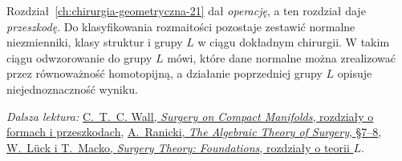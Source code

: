 Rozdział~\ref{ch:chirurgia-geometryczna-21}
dał \emph{operację}, a ten rozdział daje
\emph{przeszkodę}. Do klasyfikowania
rozmaitości pozostaje zestawić normalne
niezmienniki, klasy struktur i grupy $L$
w ciągu dokładnym chirurgii. W takim ciągu
odwzorowanie do grupy $L$ mówi, które dane normalne
można zrealizować przez równoważność
homotopijną, a działanie poprzedniej grupy
$L$ opisuje niejednoznaczność wyniku.

\par\smallskip
{\footnotesize\noindent\emph{Dalsza lektura:}
\href{https://webhomes.maths.ed.ac.uk/~v1ranick/books/scm.pdf}
{C.~T.~C. Wall, \emph{Surgery on Compact Manifolds},
rozdziały o formach i przeszkodach},
\href{https://webhomes.maths.ed.ac.uk/~v1ranick/papers/ats.pdf}
{A.\ Ranicki, \emph{The Algebraic Theory of Surgery},
§7--8},
\href{https://link.springer.com/book/10.1007/978-3-031-56334-8}
{W.\ Lück i T.\ Macko, \emph{Surgery Theory:
Foundations}, rozdziały o teorii $L$}.\par}

\clearpage
